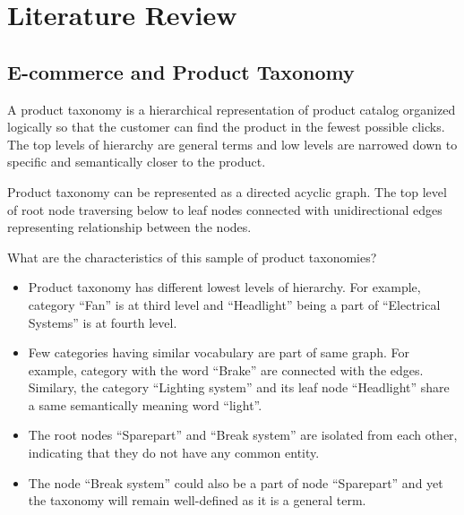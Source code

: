 \chapter{Literature Review}

\section{E-commerce and Product Taxonomy}

A product taxonomy is a hierarchical representation of product catalog organized logically so that the customer can find the product in the fewest possible clicks. The top levels of hierarchy are general terms and low levels are narrowed down to specific and semantically closer to the product.  


Product taxonomy can be represented as a directed acyclic graph. The top level of root node traversing below to leaf nodes connected with unidirectional edges representing relationship between the nodes. 


 
 
  What are the characteristics of this sample of product taxonomies?
\begin{itemize}
    \item Product taxonomy has different lowest levels of hierarchy. For example, category ``Fan'' is at third level and ``Headlight'' being a part of ``Electrical Systems'' is at fourth level.
    \item Few categories having similar vocabulary are part of same graph. For example, category with the word ``Brake'' are connected with the edges.  Similary, the category ``Lighting system'' and its leaf node ``Headlight'' share a same semantically meaning word ``light''.
    \item The root nodes ``Sparepart'' and ``Break system'' are isolated from each other, indicating that they do not have any common entity. 
    \item The node ``Break system'' could also be a part of node ``Sparepart'' and yet the taxonomy will remain well-defined as it is a general term.
\end{itemize}

